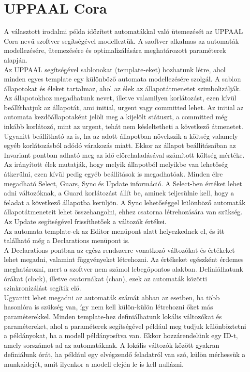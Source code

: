 \documentclass {report}
\begin{document}
\section{UPPAAL Cora}
A választott irodalmi példa időzített automatákkal való ütemezését az UPPAAL Cora nevű szoftver segítségével modelleztük. A szoftver alkalmas az automaták modellezésére, ütemezésére és optimalizálására meghatározott paraméterek alapján. \\
Az UPPAAL segítségével sablonokat (template-eket) hozhatunk létre, ahol minden egyes template egy különböző automata modellezésére szolgál. A sablon állapotokat és éleket tartalmaz, ahol az élek az állapotátmenetet szimbolizálják. \\
Az állapotokhoz megadhatunk nevet, illetve valamilyen korlátozást, ezen kívül beállíthatjuk az állapotát, ami initial, urgent vagy committed lehet. Az initial az automata kezdőállapotaként jelöli meg a kijelölt státuszt, a committed még inkább korlátozó, mint az urgent, tehát nem késleltetheti a következő átmenetet. Ugyanitt beállítható az is, ha az adott állapotban növekszik a költség valamely egyéb korlátozásból adódó várakozás miatt. Ekkor az állapot beállításaiban az Invariant pontban adható meg az idő előrehaladásával számított költség mértéke. \\
Az irányított élek mutatják, hogy melyik állapotból melyikbe van lehetőség átkerülni, ezen kívül pedig egyéb beállítások is megadhatóak. Minden élre megadható  Select, Guars, Sync és Update információ. A Select-ben értéket lehet adni változóknak, a Guard korlátozást állít be, aminek teljesülnie kell, hogy a feladat a következő állapotba kerüljön. A Sync lehetőséggel különböző automaták állapotátmeneteit lehet összehangolni, ehhez csatorna létrehozására van szükség. Az Update segítségével frissíthetőek a változók értékei.\\
Az automata template-ek az Editor menüpont alatt helyezkednek el, és itt található még a Declarations menüpont is. \\
A  Declarations pontban az egész rendszerre vonatkozó változókat és értékeket lehet megadni, valamint függvényeket létrehozni. Az értékeket egészként érdemes meghatározni, mert a szoftver nem számol lebegőpontos alakban. Definiálhatunk órákat (clock), illetve csatornákat (chan), ezek az automaták közötti szinkronizálást segítik elő.\\ Ugyanitt lehet megadni az automaták számát abban az esetben, ha több hasonlóra is szükség van, így nem kell külön-külön létrehozni őket más paraméterekkel. Minden template-hez definiálhatunk lokális változókat és paramétereket, ahol a paraméterek segítségével például meg tudjuk különböztetni a példányokat, ha a modell példányosítva van. Ekkor hozzárendelünk egy ID-t, amely sorszámot ad az automatáknak. A lokális változók között gyakran definiálunk órát, ha például egy elvégzendő feladatról van szó, külön mérhessük a munkaidejét, amit ilyenkor a modell elején le is kell nullázni. 
\end{document}
